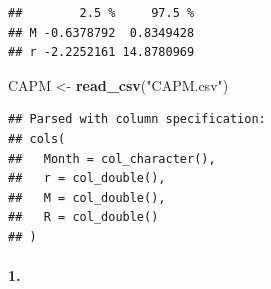 \documentclass[
]{article}
\newenvironment{Shaded}{\begin{snugshade}}{\end{snugshade}}
\newcommand{\KeywordTok}[1]{\textcolor[rgb]{0.13,0.29,0.53}{\textbf{#1}}}
\newcommand{\NormalTok}[1]{#1}
\newcommand{\StringTok}[1]{\textcolor[rgb]{0.31,0.60,0.02}{#1}}
\begin{document}
\begin{verbatim}
##        2.5 %     97.5 %
## M -0.6378792  0.8349428
## r -2.2252161 14.8780969
\end{verbatim}

\begin{Shaded}
\begin{Highlighting}[]
\NormalTok{CAPM <-}\StringTok{ }\KeywordTok{read_csv}\NormalTok{(}\StringTok{"CAPM.csv"}\NormalTok{)}
\end{Highlighting}
\end{Shaded}

\begin{verbatim}
## Parsed with column specification:
## cols(
##   Month = col_character(),
##   r = col_double(),
##   M = col_double(),
##   R = col_double()
## )
\end{verbatim}

\hypertarget{section-95}{%
\paragraph{\texorpdfstring{\textbf{1.}}{1.}}\label{section-95}}
\end{document}
